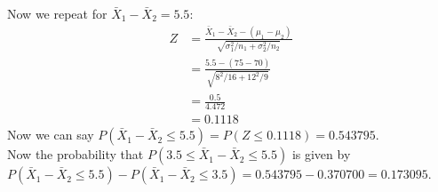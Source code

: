 \documentclass[11pt]{article}
\begin{document}
\begin{enumerate}
Now we repeat for $\bar{X}_1 - \bar{X}_2 = 5.5$:
\begin{equation}
\begin{split}
Z &= \frac{\bar{X}_1 - \bar{X}_2 - (\mu_1 - \mu_2)}{\sqrt{\sigma_1^2/n_1 + \sigma_2^2/n_2}}\\
&= \frac{5.5 - (75 - 70)}{\sqrt{8^2/16 + 12^2/9}}\\
&= \frac{0.5}{4.472} \\
&= 0.1118
\end{split}
\end{equation}
Now we can say $P(\bar{X}_1 - \bar{X}_2 \leq 5.5) = P(Z\leq0.1118) = 0.543795$.\\
Now the probability that  $P(3.5 \leq \bar{X}_1 - \bar{X}_2 \leq 5.5)$ is given by $P(\bar{X}_1 - \bar{X}_2 \leq 5.5) - P(\bar{X}_1 - \bar{X}_2 \leq 3.5) = 0.543795 - 0.370700 = 0.173095$.
\end{enumerate} 



\end{document}

